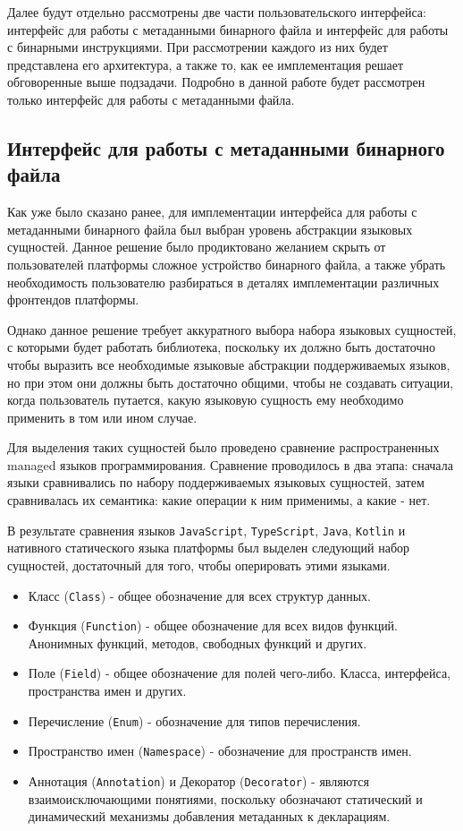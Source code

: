 Далее будут отдельно рассмотрены две части пользовательского интерфейса: интерфейс для работы с метаданными бинарного файла и интерфейс для работы с бинарными инструкциями. При рассмотрении каждого из них будет представлена его архитектура, а также то, как ее имплементация решает обговоренные выше подзадачи. Подробно в данной работе будет рассмотрен только интерфейс для работы с метаданными файла.

\subsection{Интерфейс для работы с метаданными бинарного файла}

Как уже было сказано ранее, для имплементации интерфейса для работы с метаданными бинарного файла был выбран уровень абстракции языковых сущностей. Данное решение было продиктовано желанием скрыть от пользователей платформы сложное устройство бинарного файла, а также убрать необходимость пользователю разбираться в деталях имплементации различных фронтендов платформы.

Однако данное решение требует аккуратного выбора набора языковых сущностей, с которыми будет работать библиотека, поскольку их должно быть достаточно чтобы выразить все необходимые языковые абстракции поддерживаемых языков, но при этом они должны быть достаточно общими, чтобы не создавать ситуации, когда пользователь путается, какую языковую сущность ему необходимо применить в том или ином случае.

Для выделения таких сущностей было проведено сравнение распространенных managed языков программирования. Сравнение проводилось в два этапа: сначала языки сравнивались по набору поддерживаемых языковых сущностей, затем сравнивалась их семантика: какие операции к ним применимы, а какие - нет.

В результате сравнения языков \texttt{JavaScript}, \texttt{TypeScript}, \texttt{Java}, \texttt{Kotlin} и нативного статического языка платформы был выделен следующий набор сущностей, достаточный для того, чтобы оперировать этими языками.

\begin{itemize}
    \item Класс (\texttt{Class}) - общее обозначение для всех структур данных.
    \item Функция (\texttt{Function}) - общее обозначение для всех видов функций. Анонимных функций, методов, свободных функций и других.
    \item Поле (\texttt{Field}) - общее обозначение для полей чего-либо. Класса, интерфейса, пространства имен и других.
    \item Перечисление (\texttt{Enum}) - обозначение для типов перечисления.
    \item Пространство имен (\texttt{Namespace}) - обозначение для пространств имен.
    \item Аннотация (\texttt{Annotation}) и Декоратор (\texttt{Decorator}) - являются взаимоисключающими понятиями, поскольку обозначают статический и динамический механизмы добавления метаданных к декларациям.
\end{itemize}

